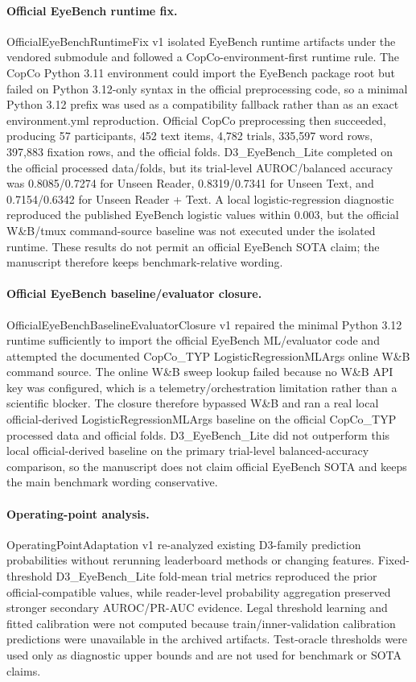 \paragraph{Official EyeBench runtime fix.}
OfficialEyeBenchRuntimeFix v1 isolated EyeBench runtime artifacts under the vendored submodule and followed a CopCo-environment-first runtime rule. The CopCo Python 3.11 environment could import the EyeBench package root but failed on Python 3.12-only syntax in the official preprocessing code, so a minimal Python 3.12 prefix was used as a compatibility fallback rather than as an exact environment.yml reproduction. Official CopCo preprocessing then succeeded, producing 57 participants, 452 text items, 4,782 trials, 335,597 word rows, 397,883 fixation rows, and the official folds. D3\_EyeBench\_Lite completed on the official processed data/folds, but its trial-level AUROC/balanced accuracy was 0.8085/0.7274 for Unseen Reader, 0.8319/0.7341 for Unseen Text, and 0.7154/0.6342 for Unseen Reader + Text. A local logistic-regression diagnostic reproduced the published EyeBench logistic values within 0.003, but the official W\&B/tmux command-source baseline was not executed under the isolated runtime. These results do not permit an official EyeBench SOTA claim; the manuscript therefore keeps benchmark-relative wording.

\paragraph{Official EyeBench baseline/evaluator closure.}
OfficialEyeBenchBaselineEvaluatorClosure v1 repaired the minimal Python 3.12 runtime sufficiently to import the official EyeBench ML/evaluator code and attempted the documented CopCo\_TYP LogisticRegressionMLArgs online W\&B command source. The online W\&B sweep lookup failed because no W\&B API key was configured, which is a telemetry/orchestration limitation rather than a scientific blocker. The closure therefore bypassed W\&B and ran a real local official-derived LogisticRegressionMLArgs baseline on the official CopCo\_TYP processed data and official folds. D3\_EyeBench\_Lite did not outperform this local official-derived baseline on the primary trial-level balanced-accuracy comparison, so the manuscript does not claim official EyeBench SOTA and keeps the main benchmark wording conservative.

\paragraph{Operating-point analysis.}
OperatingPointAdaptation v1 re-analyzed existing D3-family prediction probabilities without rerunning leaderboard methods or changing features. Fixed-threshold D3\_EyeBench\_Lite fold-mean trial metrics reproduced the prior official-compatible values, while reader-level probability aggregation preserved stronger secondary AUROC/PR-AUC evidence. Legal threshold learning and fitted calibration were not computed because train/inner-validation calibration predictions were unavailable in the archived artifacts. Test-oracle thresholds were used only as diagnostic upper bounds and are not used for benchmark or SOTA claims.

